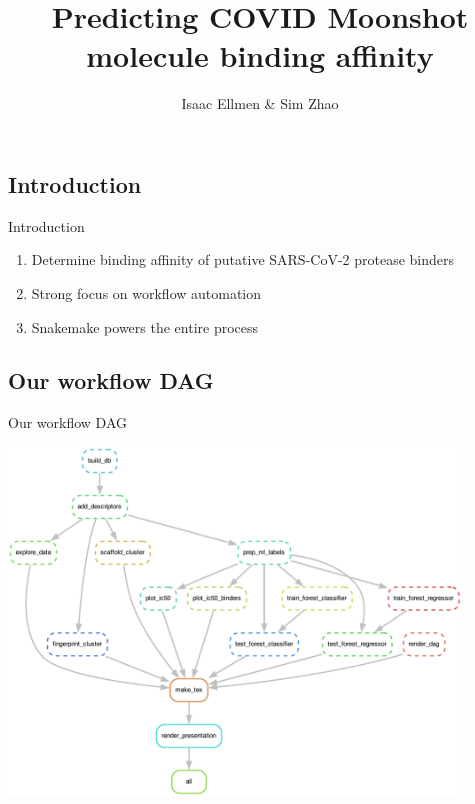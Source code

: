 \documentclass{beamer}
\title{Predicting COVID Moonshot molecule binding affinity}
\author{Isaac Ellmen \& Sim Zhao}
\institute{University of Oxford}
\date{} %
\begin{document}
{ 
\frame{\titlepage}}
    

\subsection{Introduction}
\begin{frame}{Introduction}

\begin{enumerate}
    \item Determine binding affinity of putative SARS-CoV-2 protease binders
    \item Strong focus on workflow automation
    \item Snakemake powers the entire process
\end{enumerate}
    
\end{frame}
    

\subsection{Our workflow DAG}
\begin{frame}{Our workflow DAG}

\includegraphics[width=0.9\textwidth]{../outputs/dag.pdf}
    
\end{frame}
    
\end{document}
